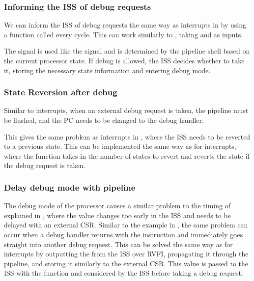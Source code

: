 \subsubsection{Informing the ISS of debug requests}

We can inform the ISS of debug requests the same way as interrupts in  by using a  function called every cycle. This can work similarly to , taking  and  as inputs.

The  signal is used like the  signal and is determined by the pipeline shell based on the current processor state. If debug is allowed, the ISS decides whether to take it, storing the necessary state information and entering debug mode.


\subsubsection{State Reversion after debug}

Similar to interrupts, when an external debug request is taken, the pipeline must be flushed, and the PC needs to be changed to the debug handler. 

This gives the same problem as interrupts in , where the ISS needs to be reverted to a previous state. This can be implemented the same way as for interrupts, where the  function takes in the number of states to revert and reverts the state if the debug request is taken. 

\subsubsection{Delay debug mode with pipeline}

The debug mode of the processor causes a similar problem to the timing of  explained in , where the value changes too early in the ISS and needs to be delayed with an external CSR. Similar to the  example in , the same problem can occur when a debug handler returns with the  instruction and immediately goes straight into another debug request. 
This can be solved the same way as for interrupts by outputting the  from the ISS over RVFI, propagating it through the pipeline, and storing it similarly to the external CSR. 
This value is passed to the ISS with the  function and considered by the ISS before taking a debug request.


